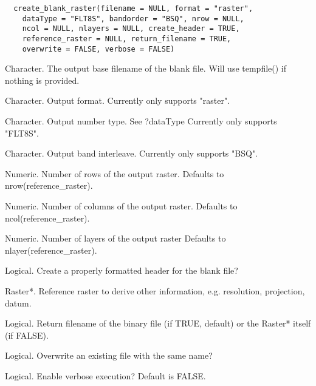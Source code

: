 \documentclass[a4paper]{book}
\begin{document}
%
\begin{Usage}
\begin{verbatim}
  create_blank_raster(filename = NULL, format = "raster",
    dataType = "FLT8S", bandorder = "BSQ", nrow = NULL,
    ncol = NULL, nlayers = NULL, create_header = TRUE,
    reference_raster = NULL, return_filename = TRUE,
    overwrite = FALSE, verbose = FALSE)
\end{verbatim}
\end{Usage}
%
\begin{Arguments}
\begin{ldescription}
\item[\code{filename}] Character. The output base filename of
the blank file.  Will use tempfile() if nothing is
provided.

\item[\code{format}] Character.  Output format.  Currently only
supports "raster".

\item[\code{dataType}] Character.  Output number type.  See
?dataType Currently only supports "FLT8S".

\item[\code{bandorder}] Character.  Output band interleave.
Currently only supports "BSQ".

\item[\code{nrow}] Numeric. Number of rows of the output raster.
Defaults to nrow(reference\_raster).

\item[\code{ncol}] Numeric. Number of columns of the output
raster. Defaults to ncol(reference\_raster).

\item[\code{nlayers}] Numeric. Number of layers of the output
raster Defaults to nlayer(reference\_raster).

\item[\code{create\_header}] Logical. Create a properly formatted
header for the blank file?

\item[\code{reference\_raster}] Raster*. Reference raster to
derive other information, e.g. resolution, projection,
datum.

\item[\code{return\_filename}] Logical. Return filename of the
binary file (if TRUE, default) or the Raster* itself (if
FALSE).

\item[\code{overwrite}] Logical. Overwrite an existing file with
the same name?

\item[\code{verbose}] Logical. Enable verbose execution? Default
is FALSE.
\end{ldescription}
\end{Arguments}
\end{document}
